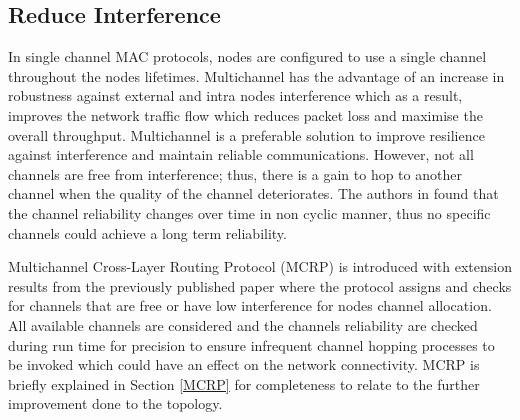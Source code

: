 \subsection{Reduce Interference}
In single channel MAC protocols, nodes are configured to use a single channel throughout the nodes lifetimes. Multichannel has the advantage of an increase in robustness against external and intra nodes interference which as a result, improves the network traffic flow which reduces packet loss and maximise the overall throughput.
Multichannel is a preferable solution to improve resilience against interference and maintain reliable communications. However, not all channels are free from interference; thus, there is a gain to hop to another channel when the quality of the channel deteriorates. 
The authors in \cite{homearea} found that the channel reliability changes over time in non cyclic manner, thus no specific channels could achieve a long term reliability. 

Multichannel Cross-Layer Routing Protocol (MCRP) \cite{mcrp} is introduced with extension results from the previously published paper where the protocol assigns and checks for channels that are free or have low interference for nodes channel allocation. All available channels are considered and the channels reliability are checked during run time for precision to ensure infrequent channel hopping processes to be invoked which could have an effect on the network connectivity. MCRP is briefly explained in Section \ref{MCRP} for completeness to relate to the further improvement done to the topology.


